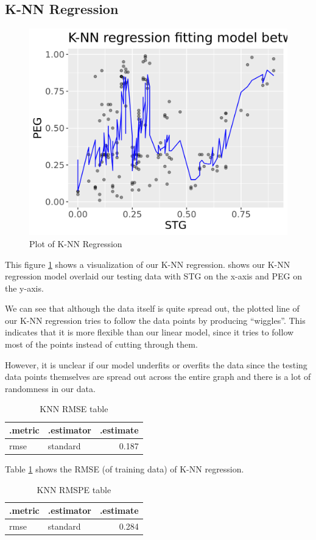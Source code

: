 \documentclass[
]{article}
\begin{document}
\hypertarget{k-nn-regression}{%
\subsection{K-NN Regression}\label{k-nn-regression}}

\begin{figure}
\includegraphics[width=0.5\linewidth]{../results/model/knn_regression_plot} \caption{Plot of K-NN Regression}\label{fig:knn-regression-plot}
\end{figure}

This figure \ref{fig:knn-regression-plot} shows a visualization of our K-NN regression. shows our K-NN regression model overlaid our testing data with STG on the x-axis and PEG on the y-axis.

We can see that although the data itself is quite spread out, the plotted line of our K-NN regression tries to follow the data points by producing ``wiggles''. This indicates that it is more flexible than our linear model, since it tries to follow most of the points instead of cutting through them.

However, it is unclear if our model underfits or overfits the data since the testing data points themselves are spread out across the entire graph and there is a lot of randomness in our data.

\begin{table}

\caption{\label{tab:knn-rmse-table}KNN RMSE table}
\centering
\begin{tabular}[t]{l|l|r}
\hline
.metric & .estimator & .estimate\\
\hline
rmse & standard & 0.187\\
\hline
\end{tabular}
\end{table}

Table \ref{tab:knn-rmse-table} shows the RMSE (of training data) of K-NN regression.

\begin{table}

\caption{\label{tab:knn-rmspe-table}KNN RMSPE table}
\centering
\begin{tabular}[t]{l|l|r}
\hline
.metric & .estimator & .estimate\\
\hline
rmse & standard & 0.284\\
\hline
\end{tabular}
\end{table}
\end{document}
